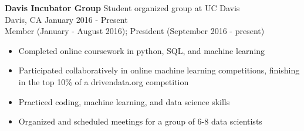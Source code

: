 \documentclass[line,margin,10pt]{res}
\begin{document}
\begin{resume}
\textbf{Davis Incubator Group} \hfill Student organized group at UC Davis\\
Davis, CA \hfill January 2016 - Present\\
Member (January - August 2016); President (September 2016 - present)
\begin{itemize} \itemsep -2pt
\item Completed online coursework in python, SQL, and machine learning
\item Participated collaboratively in online machine learning competitions, finishing in the top 10\% of a drivendata.org competition
\item Practiced coding, machine learning, and data science skills
\item Organized and scheduled meetings for a group of 6-8 data scientists
\end{itemize}



\end{resume}
\end{document}
